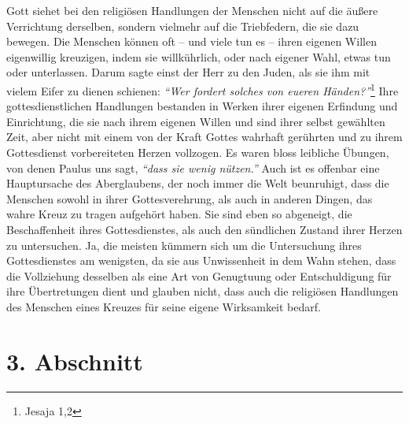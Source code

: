   Gott siehet bei den religiösen
Handlungen der Menschen nicht auf die äußere
Verrichtung derselben, sondern vielmehr auf die Triebfedern, die sie dazu
bewegen.  Die Menschen können oft -- und viele
tun es -- ihren eigenen Willen
eigenwillig kreuzigen, indem sie willkührlich, oder nach eigener Wahl, etwas
tun oder
unterlassen. Darum sagte einst der Herr zu den Juden, als
sie ihm
mit vielem
Eifer zu dienen schienen:
\textit{"`Wer fordert solches von eueren Händen?"'}\footnote{Jesaja 1,2}
 Ihre
gottesdienstlichen Handlungen bestanden in Werken ihrer eigenen Erfindung und
Einrichtung, die sie nach ihrem eigenen Willen und sind ihrer selbst gewählten
Zeit, aber nicht mit einem von der Kraft Gottes wahrhaft gerührten und zu ihrem
Gottesdienst vorbereiteten Herzen vollzogen. Es waren bloss leibliche Übungen,
von denen
Paulus uns sagt,
\textit{"`dass sie wenig nützen."'} Auch ist es offenbar eine
Hauptursache des Aberglaubens, der noch
immer die Welt beunruhigt, dass die Menschen sowohl in ihrer Gottesverehrung,
als auch in anderen Dingen, das wahre Kreuz zu tragen aufgehört haben. Sie sind
eben so abgeneigt, die Beschaffenheit ihres Gottesdienstes, als auch den
sündlichen Zustand ihrer Herzen zu untersuchen. Ja,
die meisten kümmern sich um die Untersuchung ihres Gottesdienstes am
wenigsten, da sie aus Unwissenheit in
dem Wahn stehen, dass die Vollziehung desselben als eine Art von Genugtuung
oder Entschuldigung für ihre Übertretungen dient und glauben nicht, dass auch
die religiösen Handlungen des Menschen eines Kreuzes für seine eigene
Wirksamkeit bedarf.

\section{3. Abschnitt} \label{kap6_ab3}

